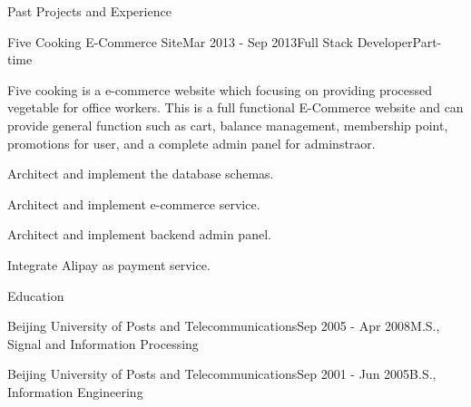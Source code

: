\documentclass{resume} %
\begin{document}
\begin{rSection}{Past Projects and Experience}
\begin{rSubsection}{Five Cooking E-Commerce Site}{Mar 2013 - Sep 2013}{Full Stack Developer}{Part-time}

Five cooking is a e-commerce website which focusing on providing processed vegetable for office workers. This is a full functional E-Commerce website and can provide general function such as cart, balance management, membership point, promotions for user, and a complete admin panel for adminstraor.

\begin{rSubsectionList}
\item Architect and implement the database schemas.
\item Architect and implement e-commerce service.
\item Architect and implement backend admin panel.
\item Integrate Alipay as payment service.
\end{rSubsectionList}
\end{rSubsection}



\end{rSection}


\begin{rSection}{Education}
\begin{rSubsection}{Beijing University of Posts and Telecommunications}{Sep 2005 - Apr 2008}{M.S., Signal and Information Processing}{}
\end{rSubsection}

\begin{rSubsection}{Beijing University of Posts and Telecommunications}{Sep 2001 - Jun 2005}{B.S., Information Engineering}{}
\end{rSubsection}

\end{rSection}
\end{document}
